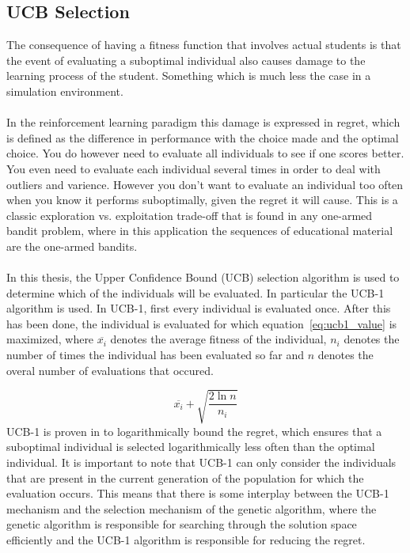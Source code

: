 \subsection{UCB Selection}
\label{sec:approach_ucb}
The consequence of having a fitness function that involves actual
students is that the event of evaluating a suboptimal individual
also causes damage to the learning process of the student. Something
which is much less the case in a simulation environment.\\\\
\noindent
In the reinforcement learning paradigm this damage is expressed in regret, which
is defined as the difference in performance with the choice made and the
optimal choice. You do however need to evaluate all individuals to see if one
scores better. You even need to evaluate each individual several times in order
to deal with outliers and varience. However you don't want to evaluate an
individual too often when you know it performs suboptimally, given the regret
it will cause. This is a classic exploration vs. exploitation trade-off that is
found in any one-armed bandit problem, where in this application the sequences
of educational material are the one-armed bandits.\\\\
\noindent
In this thesis, the Upper Confidence Bound (UCB) selection algorithm is used to
determine which of the individuals will be evaluated. In
particular the UCB-1 \citep{Auer2002} algorithm is used. In UCB-1,
first every individual is evaluated once. After this has been done, the
individual is evaluated for which equation~\eqref{eq:ucb1_value} is maximized,
where $\overline{x_i}$ denotes the average fitness of the individual, $n_i$
denotes the number of times the individual has been evaluated so far and $n$
denotes the overal number of evaluations that occured.

\begin{equation}
	\overline{x_i} + \sqrt{\frac{2 \ln n}{n_i}}
	\label{eq:ucb1_value}
\end{equation}
\noindent
UCB-1 is proven in \citep{Auer2002} to logarithmically bound the
regret, which ensures that a suboptimal individual is selected logarithmically
less often than the optimal individual. It is important to note that UCB-1 can
only consider the individuals that are present in the current generation of the
population for which the evaluation occurs. This means that there is some
interplay between the UCB-1 mechanism and the selection mechanism of the
genetic algorithm, where the genetic algorithm is responsible for searching
through the solution space efficiently and the UCB-1 algorithm is responsible
for reducing the regret.

